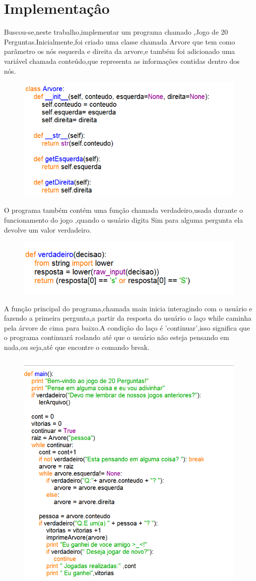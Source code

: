 \documentclass[12pt]{article}
\begin{document}
\section{Implementaçâo}
Buscou-se,neste trabalho,implementar um programa chamado ,Jogo de 20 Perguntas.Inicialmente,foi criado uma classe chamada Arvore que tem como parâmetro os nós esquerda e direita da arvore,e também foi adicionado uma variável chamada conteúdo,que representa as informações contidas dentro dos nós.
\begin{figure}[ht]
		\centering
		\includegraphics[width=.8\textwidth]{figura1.png}
		\caption{}
\end{figure}
\par O programa também contém uma função chamada verdadeiro,usada durante o funcionamento do jogo ,quando o usuário digita Sim para alguma pergunta ela devolve um valor verdadeiro.
\begin{figure}[ht]
		\centering
		\includegraphics[width=.5\textwidth]{figura2.png}
		\caption{
		}
\end{figure}
\newpage
\par A função principal do programa,chamada main inicia interagindo com o usuário e fazendo a primeira pergunta,a partir da resposta do usuário o laço while caminha pela árvore de cima para baixo.A condição do laço é 'continuar',isso significa que o programa continuará rodando até que o usuário não esteja pensando em nada,ou seja,até que encontre o comando break.
	\begin{figure}[ht]
		\centering
		\includegraphics[width=.5\textwidth]{figura3.png}
		\caption{
		}
	\end{figure}
\end{document}
